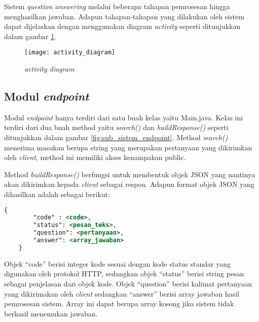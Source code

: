 Sistem \emph{question answering} melalui beberapa tahapan pemrosesan hingga menghasilkan jawaban. Adapun tahapan-tahapan yang dilakukan oleh sistem dapat dijelaskan dengan menggunakan diagram \emph{activity} seperti ditunjukkan dalam gambar \ref{fig:activity_diagram}.

\begin{figure}[hb]
    \centering
    \texttt{[image: activity\_diagram]}
    \caption{\emph{activity diagram}}
    \label{fig:activity_diagram}
\end{figure}


\subsection{Modul \emph{endpoint}}
Modul \emph{endpoint} hanya terdiri dari satu buah kelas yaitu Main.java. Kelas ini terdiri dari dua buah method yaitu \emph{search()} dan \emph{buildResponse()} seperti ditunjukkan dalam gambar \ref{fig:sub_sistem_endpoint}. Method \emph{search()} menerima masukan berupa string yang merupakan pertanyaan yang dikirimkan oleh \emph{client}, method ini memiliki akses kenampakan public.

Method \emph{buildResponse()} berfungsi untuk membentuk objek JSON yang nantinya akan dikirimkan kepada \emph{client} sebagai respon. Adapun format objek JSON yang dihasilkan adalah sebagai berikut:

\begin{lstlisting}[language=XML,xleftmargin=0pt]
    {
        "code" : <code>,
        "status": <pesan_teks>,
        "question": <pertanyaan>,
        "answer": <array_jawaban>
    }
\end{lstlisting}

Objek ``code'' berisi integer kode sesuai dengan kode status standar yang digunakan oleh protokol HTTP, sedangkan objek ``status'' berisi string pesan sebagai penjelasan dari objek kode. Objek ``question'' berisi kalimat pertanyaan yang dikirimakan oleh \emph{client} sedangkan ``answer'' berisi array jawaban hasil pemrosesan sistem. Array ini dapat berupa array kosong jika sistem tidak berhasil menemukan jawaban.

